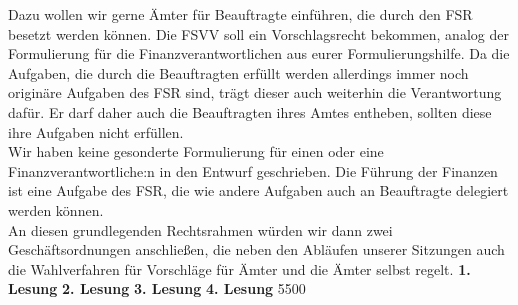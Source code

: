 {        Dazu wollen wir gerne Ämter für Beauftragte einführen, die durch den FSR besetzt werden können. Die FSVV soll ein
        Vorschlagsrecht bekommen, analog der Formulierung für die Finanzverantwortlichen aus eurer Formulierungshilfe.
        Da die Aufgaben, die durch die Beauftragten erfüllt werden allerdings immer noch originäre Aufgaben des FSR sind,
        trägt dieser auch weiterhin die Verantwortung dafür. Er darf daher auch die Beauftragten ihres Amtes entheben,
        sollten diese ihre Aufgaben nicht erfüllen.\\
        Wir haben keine gesonderte Formulierung für einen oder eine Finanzverantwortliche:n in den Entwurf geschrieben.
        Die Führung der Finanzen ist eine Aufgabe des FSR, die wie andere Aufgaben auch an Beauftragte delegiert werden können.\\
        An diesen grundlegenden Rechtsrahmen würden wir dann zwei Geschäftsordnungen anschließen,
        die neben den Abläufen unserer Sitzungen auch die Wahlverfahren für Vorschläge für Ämter und die Ämter selbst regelt.
    }{
        \textbf{1. Lesung}
        \ul{}
        \textbf{2. Lesung}
        \ul{}
        \textbf{3. Lesung}
        \ul{}
        \textbf{4. Lesung}
        \ul{}
    }{55}{0}{0}
    
